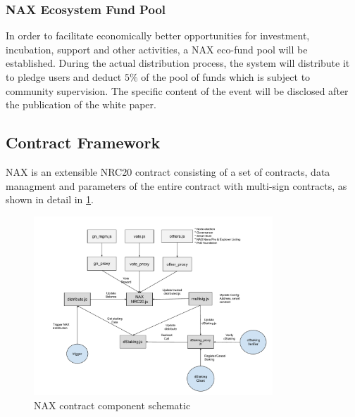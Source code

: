 \subsubsection{NAX Ecosystem Fund Pool}
In order to facilitate economically better opportunities for investment, incubation, support and other activities, a NAX eco-fund pool will be established. During the actual distribution process, the system will distribute it to pledge users and deduct $5\%$ of the pool of funds which is subject to community supervision. The specific content of the event will be disclosed after the publication of the white paper.

\subsection{Contract Framework}
NAX is an extensible NRC20 contract consisting of a set of contracts, data managment and parameters of the entire contract with multi-sign contracts, as shown in detail in \ref{fig:nax_framework}.

\begin{figure}[htbp]
  \centering
  \includegraphics[width=0.8\textwidth]{../common/nax.pdf}
  \caption{NAX contract component schematic \label{fig:nax_framework}}
\end{figure}
